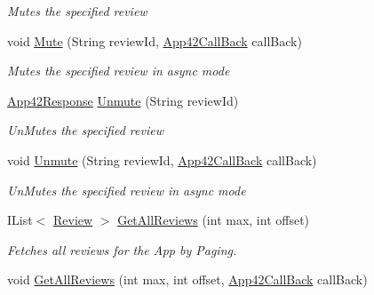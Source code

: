 \begin{DoxyCompactItemize}
\begin{DoxyCompactList}\small\item\em Mutes the specified review \end{DoxyCompactList}\item 
void \hyperlink{classcom_1_1shephertz_1_1app42_1_1paas_1_1sdk_1_1csharp_1_1review_1_1_review_service_a061f5d2ca651b5c856c1109e8593bf2a}{Mute} (String review\+Id, \hyperlink{interfacecom_1_1shephertz_1_1app42_1_1paas_1_1sdk_1_1csharp_1_1_app42_call_back}{App42\+Call\+Back} call\+Back)
\begin{DoxyCompactList}\small\item\em Mutes the specified review in async mode \end{DoxyCompactList}\item 
\hyperlink{classcom_1_1shephertz_1_1app42_1_1paas_1_1sdk_1_1csharp_1_1_app42_response}{App42\+Response} \hyperlink{classcom_1_1shephertz_1_1app42_1_1paas_1_1sdk_1_1csharp_1_1review_1_1_review_service_a0c2b84115ca738d6dc256d73bd214b73}{Unmute} (String review\+Id)
\begin{DoxyCompactList}\small\item\em Un\+Mutes the specified review \end{DoxyCompactList}\item 
void \hyperlink{classcom_1_1shephertz_1_1app42_1_1paas_1_1sdk_1_1csharp_1_1review_1_1_review_service_a0bdeeb013cc77232196bef097c52ca08}{Unmute} (String review\+Id, \hyperlink{interfacecom_1_1shephertz_1_1app42_1_1paas_1_1sdk_1_1csharp_1_1_app42_call_back}{App42\+Call\+Back} call\+Back)
\begin{DoxyCompactList}\small\item\em Un\+Mutes the specified review in async mode \end{DoxyCompactList}\item 
I\+List$<$ \hyperlink{classcom_1_1shephertz_1_1app42_1_1paas_1_1sdk_1_1csharp_1_1review_1_1_review}{Review} $>$ \hyperlink{classcom_1_1shephertz_1_1app42_1_1paas_1_1sdk_1_1csharp_1_1review_1_1_review_service_a02f11e92bb2220d9d663cf8935a54202}{Get\+All\+Reviews} (int max, int offset)
\begin{DoxyCompactList}\small\item\em Fetches all reviews for the App by Paging. \end{DoxyCompactList}\item 
void \hyperlink{classcom_1_1shephertz_1_1app42_1_1paas_1_1sdk_1_1csharp_1_1review_1_1_review_service_ac992931623a558a52310918202233fd9}{Get\+All\+Reviews} (int max, int offset, \hyperlink{interfacecom_1_1shephertz_1_1app42_1_1paas_1_1sdk_1_1csharp_1_1_app42_call_back}{App42\+Call\+Back} call\+Back)

\end{DoxyCompactItemize}
